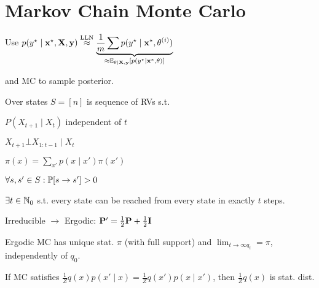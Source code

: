 \section{Markov Chain Monte Carlo}

\begin{definition}[Idea]
    Use \(p(y^\star \mid \x^\star, \X, \y) \overset{\text{LLN}}{\approx} \underbrace{\frac{1}{m}\sum p(y^\star \mid \x^\star, \theta^{(i)})}_{\approx \E_{\theta \mid \X, \y}[p(y^\star \mid \x^*, \theta)]}\)

   \vspace{-15pt} and MC to sample posterior.
\end{definition}

\begin{definition}[MC]
    Over states \(S = [n]\) is sequence of RVs s.t.
    \begin{itemize*}
        \item \(P(X_{t+1} \mid X_t)\) independent of \(t\)
        \item \(X_{t+1} \bot X_{1:t-1} \mid X_t\)
    \end{itemize*}
\end{definition}

\begin{definition}[Stationary]
    \(\pi(x) = \sum_{x'} p(x \mid x')\pi(x')\)
\end{definition}

\begin{definition}[Irreducible]
    \(\forall s, s' \in S: \P[s \to s'] > 0\)
\end{definition}

\begin{definition}[Ergodic]
    \(\exists t \in \N_0\) s.t. every state can be reached from every state in exactly \(t\) steps.
\end{definition}

Irreducible \(\to\) Ergodic: \(\PM' = \frac{1}{2}\PM + \frac{1}{2}\I\)

\begin{colored}
    Ergodic MC has unique stat. \(\pi\) (with full support) and \(\lim_{t \to \infty q_t} = \pi\), independently of \(q_0\).
\end{colored}

\begin{definition}
    If MC satisfies \(\frac{1}{Z}q(x)p(x'\mid x) = \frac{1}{Z}q(x')p(x \mid x')\), then \(\frac{1}{Z}q(x)\) is stat. dist.
\end{definition}

